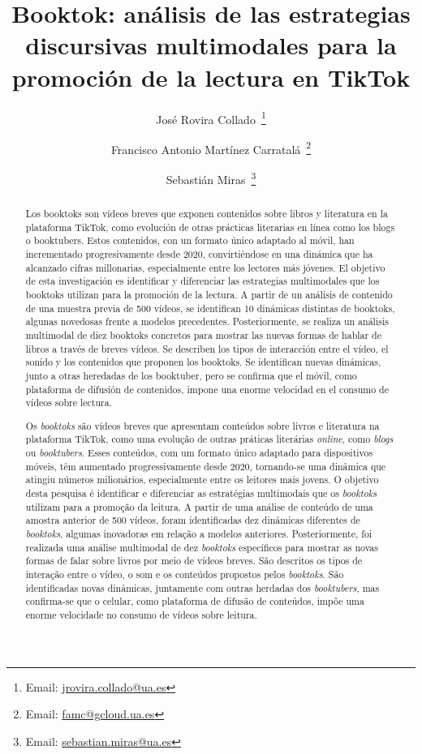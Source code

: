 \documentclass[spanish]{textolivre}
\title{Booktok: análisis de las estrategias discursivas multimodales para la promoción de la lectura en TikTok}
\author[1]{José Rovira Collado~\orcid{0000-0002-3491-8747}\thanks{Email: \href{mailto:jrovira.collado@ua.es}{jrovira.collado@ua.es}}}
\author[1]{Francisco Antonio Martínez Carratalá~\orcid{0000-0002-0587-5063}\thanks{Email: \href{mailto:famc@gcloud.ua.es}{famc@gcloud.ua.es}}}
\author[1]{Sebastián Miras~\orcid{0000-0002-4259-3890}\thanks{Email: \href{mailto:sebastian.miras@ua.es}{sebastian.miras@ua.es}}}
\affil[1]{Universidad de Alicante, Facultad de Educación, Alicante, España.}
\begin{document}
\maketitle
\begin{polyabstract}
\begin{abstract}
Los booktoks son vídeos breves que exponen contenidos sobre libros y literatura en la plataforma TikTok, como evolución de otras prácticas literarias en línea como los blogs o booktubers. Estos contenidos, con un formato único adaptado al móvil, han incrementado progresivamente desde 2020, convirtiéndose en una dinámica que ha alcanzado cifras millonarias, especialmente entre los lectores más jóvenes. El objetivo de esta investigación es identificar y diferenciar las estrategias multimodales que los booktoks utilizan para la promoción de la lectura. A partir de un análisis de contenido de una muestra previa de 500 vídeos, se identifican 10 dinámicas distintas de booktoks, algunas novedosas frente a modelos precedentes. Posteriormente, se realiza un análisis multimodal de diez booktoks concretos para mostrar las nuevas formas de hablar de libros a través de breves vídeos. Se describen los tipos de interacción entre el vídeo, el sonido y los contenidos que proponen los booktoks. Se identifican nuevas dinámicas, junto a otras heredadas de los booktuber, pero se confirma que el móvil, como plataforma de difusión de contenidos, impone una enorme velocidad en el consumo de vídeos sobre lectura.

\end{abstract}

\begin{portuguese}
\begin{abstract}
Os \textit{booktoks} são vídeos breves que apresentam conteúdos sobre livros e literatura na plataforma TikTok, como uma evolução de outras práticas literárias \textit{online}, como \textit{blogs} ou \textit{booktubers}. Esses conteúdos, com um formato único adaptado para dispositivos móveis, têm aumentado progressivamente desde 2020, tornando-se uma dinâmica que atingiu números milionários, especialmente entre os leitores mais jovens. O objetivo desta pesquisa é identificar e diferenciar as estratégias multimodais que os \textit{booktoks} utilizam para a promoção da leitura. A partir de uma análise de conteúdo de uma amostra anterior de 500 vídeos, foram identificadas dez dinâmicas diferentes de \textit{booktoks}, algumas inovadoras em relação a modelos anteriores. Posteriormente, foi realizada uma análise multimodal de dez \textit{booktoks} específicos para mostrar as novas formas de falar sobre livros por meio de vídeos breves. São descritos os tipos de interação entre o vídeo, o som e os conteúdos propostos pelos \textit{booktoks}. São identificadas novas dinâmicas, juntamente com outras herdadas dos \textit{booktubers}, mas confirma-se que o celular, como plataforma de difusão de conteúdos, impõe uma enorme velocidade no consumo de vídeos sobre leitura.


\end{abstract}
\end{portuguese}
\end{polyabstract}
\end{document}
